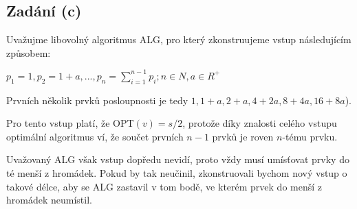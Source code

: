 \documentclass[a4paper, 12pt]{article}
\begin{document}
  \subsection{Zadání (c)}
  Uvažujme libovolný algoritmus ALG, pro který zkonstruujeme vstup následujícím způsobem:
  \begin{center}
    $p_1=1, p_2=1+a,..., p_n=\sum\limits_{i=1}^{n-1} p_i; n \in N, a \in R^+$
  \end{center}
  Prvních několik prvků posloupnosti je tedy $1, 1+a, 2+a, 4+2a, 8+4a, 16+8a$).

  Pro tento vstup platí, že OPT$(v)=s/2$, protože díky znalosti celého vstupu optimální algoritmus ví, že součet prvních $n-1$ prvků je roven $n$-tému prvku.

  Uvažovaný ALG však vstup dopředu nevidí, proto vždy musí umísťovat prvky do té menší z hromádek. Pokud by tak neučinil, zkonstruovali bychom nový vstup o takové délce, aby se ALG zastavil v tom bodě, ve kterém prvek do menší z hromádek neumístil.

\end{document}
